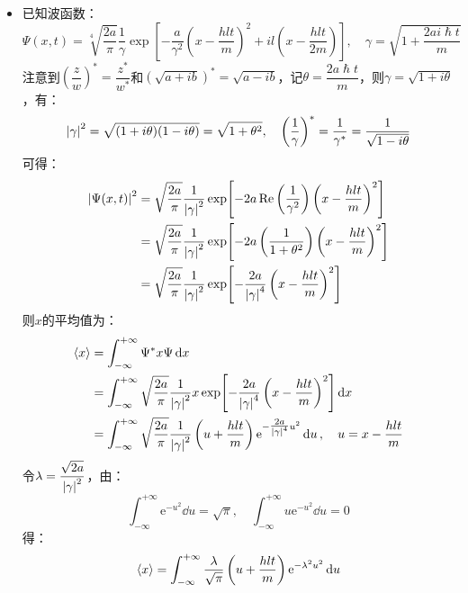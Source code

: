\documentclass[a4paper,fontset=none]{ctexart}
\renewcommand\hbar\hslash
\begin{document}
    \begin{itemize}
        \item[21.]
        已知波函数：
        \[
            \Psi(x,t) = \sqrt[4]{\frac{2a}{\pi}} \frac{1}{\gamma} \exp[-\frac{a}{\gamma^2}\left(x - \frac{hlt}{m}\right)^2 + il\left(x - \frac{hlt}{2m}\right)],\quad \gamma = \sqrt{1 + \frac{2ai\hbar t}{m}}
        \]
        注意到$\left(\dfrac{z}{w}\right)^* = \dfrac{z^*}{w^*}$和$\left(\sqrt{a+ib}\right)^* = \sqrt{a-ib}$，记$\theta = \dfrac{2a\hbar t}{m}$，则$\gamma = \sqrt{1+i\theta}$，有：
        \[
            \abs{\gamma}^2 = \sqrt{(1+i\theta) (1-i\theta)} = \sqrt{1 + \theta^2},\quad
            \left(\frac{1}{\gamma}\right)^* = \frac{1}{\gamma^*} = \frac{1}{\sqrt{1-i\theta}}
        \]
        可得：
        \begin{align*}
            \abs{\Psi(x,t)}^2
            &= \sqrt{\frac{2a}{\pi}} \frac{1}{\abs{\gamma}^2} \exp[-2a\Re\left(\frac{1}{\gamma^2}\right)\left(x - \frac{hlt}{m}\right)^2] \\
            &= \sqrt{\frac{2a}{\pi}} \frac{1}{\abs{\gamma}^2} \exp[-2a\left(\frac{1}{1 + \theta^2}\right) \left(x - \frac{hlt}{m}\right)^2] \\
            &= \sqrt{\frac{2a}{\pi}} \frac{1}{\abs{\gamma}^2} \exp[-\frac{2a}{\abs{\gamma}^4} \left(x - \frac{hlt}{m}\right)^2]
        \end{align*}
        则$x$的平均值为：
        \begin{align*}
            \expval{x}
            &= \int_{-\infty}^{+\infty} \Psi^* x \Psi \dd{x} \\
            &= \int_{-\infty}^{+\infty} \sqrt{\frac{2a}{\pi}} \frac{1}{\abs{\gamma}^2} x \exp[-\frac{2a}{\abs{\gamma}^4} \left(x - \frac{hlt}{m}\right)^2] \dd{x} \\
            &= \int_{-\infty}^{+\infty} \sqrt{\frac{2a}{\pi}} \frac{1}{\abs{\gamma}^2} \left(u + \frac{hlt}{m}\right) \mathrm{e}^{-\tfrac{2a}{\abs{\gamma}^4} u^2} \dd{u},\quad u = x - \frac{hlt}{m}
        \end{align*}
        令$\lambda = \dfrac{\sqrt{2a}}{\abs{\gamma}^2}$，由：
        \[
            \int_{-\infty}^{+\infty} \mathrm{e}^{-u^2} \dd{u} = \sqrt{\pi},\quad
            \int_{-\infty}^{+\infty} u \mathrm{e}^{-u^2} \dd{u} = 0
        \]
        得：
        \begin{align*}
            \expval{x}
            &= \int_{-\infty}^{+\infty} \frac{\lambda}{\sqrt{\pi}} \left(u + \frac{hlt}{m}\right) \mathrm{e}^{-\lambda^2 u^2} \dd{u} \\

\end{align*}
\end{itemize}
\end{document}
